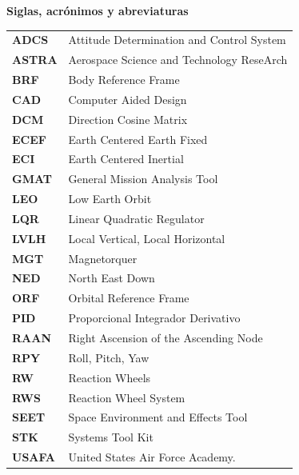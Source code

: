 \begin{center}
    \textbf{Siglas, acrónimos y abreviaturas}    %
\end{center}

\begin{tabular}{m{2cm}p{10cm}}
    \textbf{ADCS}  & Attitude Determination and Control System   \\
    \textbf{ASTRA} & Aerospace   Science and Technology ReseArch \\
    \textbf{BRF}   & Body Reference Frame                        \\
    \textbf{CAD}   & Computer Aided Design                       \\
    \textbf{DCM}   & Direction Cosine Matrix                     \\
    \textbf{ECEF}  & Earth Centered Earth Fixed                  \\
    \textbf{ECI}   & Earth Centered Inertial                     \\
    \textbf{GMAT}  & General   Mission Analysis Tool             \\
    \textbf{LEO}   & Low Earth Orbit                             \\
    \textbf{LQR}   & Linear Quadratic Regulator                  \\
    \textbf{LVLH}  & Local Vertical, Local Horizontal            \\
    \textbf{MGT}   & Magnetorquer                                \\
    \textbf{NED}   & North East Down                             \\
    \textbf{ORF}   & Orbital Reference Frame                     \\
    \textbf{PID}   & Proporcional Integrador Derivativo          \\
    \textbf{RAAN}  & Right Ascension of the Ascending Node     \\
    \textbf{RPY}   & Roll, Pitch, Yaw                            \\
    \textbf{RW}    & Reaction Wheels                             \\
    \textbf{RWS}   & Reaction Wheel System                       \\
    \textbf{SEET}  & Space Environment and Effects Tool          \\
    \textbf{STK}   & Systems Tool Kit                            \\
    \textbf{USAFA} & United States Air Force   Academy.
\end{tabular}

